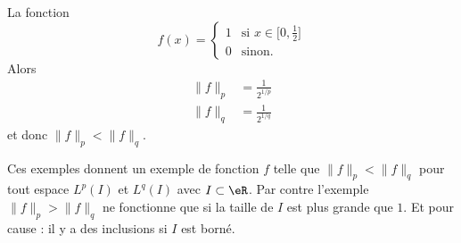 \begin{subproof}
	\spitem[Exemple de \( \| f \|_p<\| f \|_q\)]

	La fonction
	\begin{equation}
		f(x)=\begin{cases}
			1 & \text{si } x\in\mathopen[ 0 , \frac{ 1 }{2} \mathclose] \\
			0 & \text{sinon.}
		\end{cases}
	\end{equation}
	Alors
	\begin{subequations}
		\begin{align}
			\| f \|_p & =\frac{1}{ 2^{1/p} } \\
			\| f \|_q & =\frac{1}{ 2^{1/q} }
		\end{align}
	\end{subequations}
	et donc \( \| f \|_p<\| f \|_q\).
\end{subproof}

Ces exemples donnent un exemple de fonction \( f\) telle que \( \| f \|_p<\| f \|_q\) pour tout espace \( L^p(I)\) et \( L^q(I)\) avec \( I\subset \eR\). Par contre l'exemple \( \| f \|_p>\| f \|_q\) ne fonctionne que si la taille de \( I\) est plus grande que \( 1\). Et pour cause : il y a des inclusions si \( I\) est borné.

